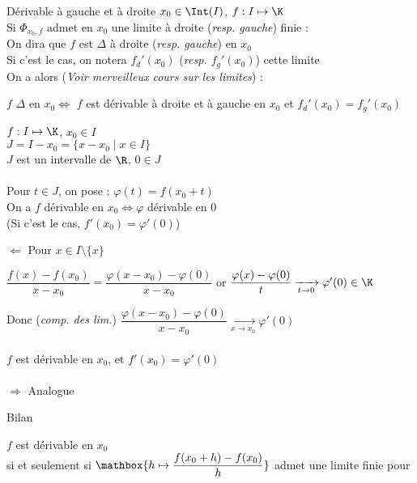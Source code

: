 \documentclass[12pt,a4paper]{report}
\begin{document}
\begin{definition}{Dérivable à gauche et à droite}{}
$x_0 \in \Int (I)$, $f:I \mapsto \K$\\
Si $\Phi_{x_0,f}$ admet en $x_0$ une limite à droite (\textit{resp. gauche}) finie : \\
On dira que $f$ est $\Delta$ à droite (\textit{resp. gauche}) en $x_0$\\
Si c'est le cas, on notera $f_d'(x_0)$ (\textit{resp. $f_g'(x_0)$}) cette limite\\
On a alors (\textit{Voir merveilleux cours sur les limites}) :
\begin{center}
    $f$ $\Delta$ en $x_0 \Longleftrightarrow $ $f$ est dérivable à droite et à gauche en $x_0$ et $f_d'(x_0)=f_g'(x_0)$
\end{center}
\end{definition}

\begin{remarque}
$f : I \mapsto \K$, $x_0 \in I$\\
$J=I-x_0 = \lbrace x-x_0 \mid x \in I \rbrace$\\
$J$ est un intervalle de $\R$, $0\in J$\\
\\
Pour $t\in J$, on pose : $\varphi (t) = f(x_0 +t)$\\
On a $f$ dérivable en $x_0 \Longleftrightarrow \varphi$ dérivable en $0$\\
(Si c'est le cas, $f'(x_0) = \varphi'(0)$)
\\

\begin{demo}{}
$\Longleftarrow$ Pour $x\in I\setminus \lbrace x \rbrace$
\begin{center}
    $\dfrac{f(x)-f(x_0)}{x-x_0} = \dfrac{\varphi(x-x_0)-\varphi(0)}{x-x_0}$ \: \: \: or $\dfrac{\varphi(x)-\varphi(0)}{t} \xrightarrow[t \to 0]{} \varphi'(0) \in \K$
\end{center}
Donc (\textit{comp. des lim.}) $\dfrac{\varphi(x-x_0)-\varphi(0)}{x-x_0}\xrightarrow[x \to x_0]{} \varphi'(0)$ \\
\\
$f$ est dérivable en $x_0$, et $f'(x_0) = \varphi'(0)$\\
\\
$\Longrightarrow$ Analogue
\end{demo}

\begin{proposition}{Bilan}{}
\begin{center}
    $f$ est dérivable en $x_0$ \\ si et seulement si $\mathbox{h \mapsto \dfrac{f(x_0 + h) - f(x_0)}{h}}$ admet une limite finie pour 
\end{center}
\end{proposition}
\end{remarque}
\end{document}
